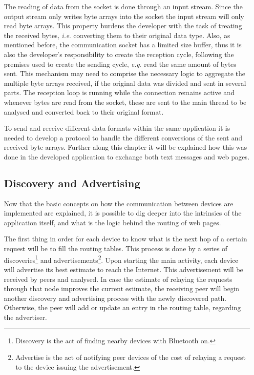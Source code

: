 The reading of data from the socket is done through an input stream. Since the output stream only writes byte arrays into the socket the input stream will only read byte arrays. This property burdens the developer with the task of treating the received bytes, \textit{i.e.} converting them to their original data type. Also, as mentioned before, the communication socket has a limited size buffer, thus it is also the developer's responsibility to create the reception cycle, following the premises used to create the sending cycle, \textit{e.g.} read the same amount of bytes sent. This mechanism may need to comprise the necessary logic to aggregate the multiple byte arrays received, if the original data was divided and sent in several parts. The reception loop is running while the connection remains active and whenever bytes are read from the socket, these are sent to the main thread to be analysed and converted back to their original format.

To send and receive different data formats within the same application it is needed to develop a protocol to handle the different conversions of the sent and received byte arrays. Further along this chapter it will be explained how this was done in the developed application to exchange both text messages and web pages.

\subsection{Discovery and Advertising}
\label{subsec:disandadv}

Now that the basic concepts on how the communication between devices are implemented are explained, it is possible to dig deeper into the intrinsics of the application itself, and what is the logic behind the routing of web pages.

The first thing in order for each device to know what is the next hop of a certain request will be to fill the routing tables. This process is done by a series of discoveries\footnote{Discovery is the act of finding nearby devices with Bluetooth on.} and advertisements\footnote{Advertise is the act of notifying peer devices of the cost of relaying a request to the device issuing the advertisement.}. Upon starting the main activity, each device will advertise its best estimate to reach the Internet. This advertisement will be received by peers and analysed. In case the estimate of relaying the requests through that node improves the current estimate, the receiving peer will begin another discovery and advertising process with the newly discovered path. Otherwise, the peer will add or update an entry in the routing table, regarding the advertiser.

